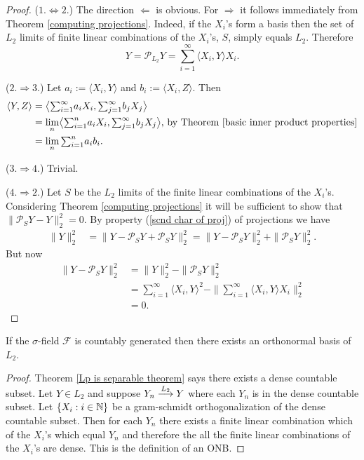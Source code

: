 \begin{proof}
($1.\Longleftrightarrow 2.$) The direction $\Leftarrow$ is obvious. For $\Rightarrow$ it follows immediately from Theorem \ref{computing projections}. Indeed, if the $X_i$'s form a basis then the set of $L_2$ limits of finite linear combinations of the $X_i$'s, $S$, simply equals $L_2$. Therefore
\[
Y = \mathcal P_{L_2}Y = \sum_{i=1}^\infty \langle X_i, Y\rangle X_i.
\]

($2.\Longrightarrow 3.$) Let $a_i := \langle X_i, Y\rangle$ and $b_i := \langle X_i, Z\rangle$. Then
\begin{align*}
\langle Y, Z \rangle
&=  \bigl\langle {\textstyle\sum_{i=1}^\infty} a_i X_i, {\textstyle\sum_{j=1}^\infty} b_j X_j \bigr\rangle \\
&= \lim_n \bigl\langle {\textstyle\sum_{i=1}^n} a_i X_i, {\textstyle\sum_{j=1}^\infty} b_j X_j \bigr\rangle,\,\text{by Theorem \ref{basic inner product properties}} \\
&= \lim_n {\textstyle\sum_{i=1}^{n}}   a_ib_i.
\end{align*}



($3.\Longrightarrow 4.$) Trivial.

($4.\Longrightarrow 	2.$) Let $S$ be the $L_2$ limits of the finite linear combinations of the $X_i$'s. Considering Theorem \ref{computing projections} it will be sufficient to show that $\|\mathcal P_S Y - Y  \|_2^2 = 0$. By property (\ref{scnd char of proj}) of projections we have
\begin{align*}
\| Y \|_2^2 & = \|Y-\mathcal P_S Y + \mathcal P_SY \|_2^2  =  \|Y-\mathcal P_S Y\|_2^2 + \|\mathcal P_SY \|_2^2.
\end{align*}
But now
\begin{align*}
\|Y-\mathcal P_S Y  \|_2^2& = \| Y \|_2^2 - \|\mathcal P_SY \|_2^2 \\
& = {\textstyle\sum_{i=1}^\infty \langle X_i, Y\rangle^2}  - \|\textstyle\sum_{i=1}^\infty \langle X_i, Y\rangle X_i \|_2^2 \\
& = 0.
\end{align*}
\end{proof}


\begin{theorem}
If the $\sigma$-field $\mathcal F$ is countably generated then there exists an orthonormal basis of $L_2$.
\end{theorem}
\begin{proof}
Theorem \ref{Lp is separable theorem}  says there exists a dense countable subset. Let $Y\in L_2$ and suppose $Y_n\overset{\small L_2} \longrightarrow Y$ where each $Y_n$ is in the dense countable subset. Let $\{X_i: i \in \Bbb N \}$ be a gram-schmidt orthogonalization of the dense countable subset. Then for each $Y_n$ there exists a finite linear combination which of the $X_i$'s which equal $Y_n$ and therefore the all the finite linear combinations of the $X_i$'s are dense. This is the definition of an ONB.
\end{proof}



